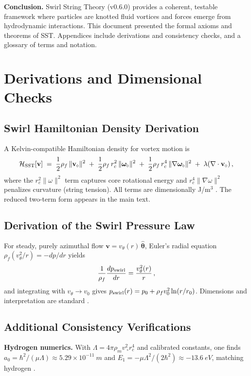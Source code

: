 \documentclass[11pt]{article}
\begin{document}
	\bigskip
	\noindent\textbf{Conclusion.} Swirl String Theory (v0.6.0) provides a coherent, testable framework where particles are knotted fluid vortices and forces emerge from hydrodynamic interactions. This document presented the formal axioms and theorems of SST. Appendices include derivations and consistency checks, and a glossary of terms and notation.

	\appendix

	\section{Derivations and Dimensional Checks}\label{app:deriv}

	\subsection{Swirl Hamiltonian Density Derivation}
	A Kelvin-compatible Hamiltonian density for vortex motion is
	\[
		\mathcal{H}_{\rm SST}[\mathbf{v}] \;=\; \frac{1}{2}\rho_f\,\|\mathbf{v}_{\!\!\;\circ}\|^2 \;+\; \frac{1}{2}\rho_f\,r_c^2\,\|\boldsymbol{\omega}_{\!\!\;\circ}\|^2 \;+\; \frac{1}{2}\rho_f\,r_c^4\,\|\nabla\boldsymbol{\omega}_{\!\!\;\circ}\|^2 \;+\; \lambda(\nabla\cdot\mathbf{v}_{\!\!\;\circ})\,,
	\]
	where the $r_c^2\|\omega\|^2$ term captures core rotational energy and $r_c^4\|\nabla\omega\|^2$ penalizes curvature (string tension). All terms are dimensionally J/m$^3$ \cite{Batchelor1967,Saffman1992}. The reduced two-term form appears in the main text.

	\subsection{Derivation of the Swirl Pressure Law}
	For steady, purely azimuthal flow $\mathbf{v}=v_\theta(r)\,\hat{\boldsymbol{\theta}}$, Euler’s radial equation $\rho_f (v_\theta^2/r)=-dp/dr$ yields
	\[
		\frac{1}{\rho_f}\frac{d p_{\rm swirl}}{dr} = \frac{v_\theta^2(r)}{r}\,,
	\]
	and integrating with $v_\theta\to v_0$ gives $p_{\rm swirl}(r)=p_0+\rho_f v_0^2\ln(r/r_0)$. Dimensions and interpretation are standard \cite{Batchelor1967,Saffman1992,Iskandarani2025Canon034}.

	\subsection{Additional Consistency Verifications}
	\textbf{Hydrogen numerics.} With $\Lambda=4\pi\rho_m v_{\!\!\;\circ}^2 r_c^4$ and calibrated constants, one finds $a_0=\hbar^2/(\mu\Lambda)\approx 5.29\times10^{-11}~\si{m}$ and $E_1=-\mu\Lambda^2/(2\hbar^2)\approx -13.6~\si{eV}$, matching hydrogen \cite{Iskandarani2025Canon034,Iskandarani2025Hydrogen}.
\end{document}
